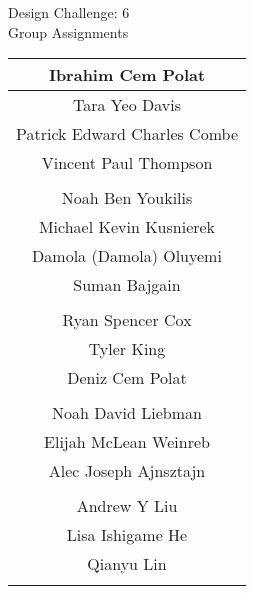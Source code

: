 \documentclass{article}
\begin{document}
\renewcommand{\arraystretch}{1.2} 
\begin{center}
{\Large Design Challenge: 6\\ 
Group Assignments} \\ 
\begin{tabular}{|c|} \hline 
Ibrahim Cem Polat\\ \hline 
Tara Yeo Davis\\ \hline 
Patrick Edward Charles Combe\\ \hline 
Vincent Paul Thompson\\ \hline 
\multicolumn{1}{c}{\vspace{1mm}} \\ 
\hline 
Noah Ben Youkilis\\ \hline 
Michael Kevin Kusnierek\\ \hline 
Damola (Damola) Oluyemi\\ \hline 
Suman Bajgain\\ \hline 
\multicolumn{1}{c}{\vspace{1mm}} \\ 
\hline 
Ryan Spencer Cox\\ \hline 
Tyler King\\ \hline 
Deniz Cem Polat\\ \hline 
\multicolumn{1}{c}{\vspace{1mm}} \\ 
\hline 
Noah David Liebman\\ \hline 
Elijah McLean Weinreb\\ \hline 
Alec Joseph Ajnsztajn\\ \hline 
\multicolumn{1}{c}{\vspace{1mm}} \\ 
\hline 
Andrew Y Liu\\ \hline 
Lisa Ishigame He\\ \hline 
Qianyu Lin\\ \hline 
\multicolumn{1}{c}{\vspace{1mm}} \\ 

\end{tabular} \\ 
\end{center}
\end{document}
